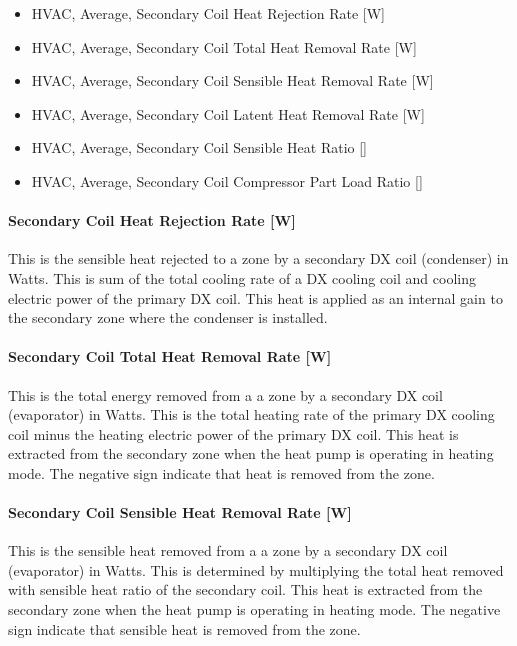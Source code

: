 \begin{itemize}
\item
  HVAC, Average, Secondary Coil Heat Rejection Rate {[}W{]}
\item
  HVAC, Average, Secondary Coil Total Heat Removal Rate {[}W{]}
\item
  HVAC, Average, Secondary Coil Sensible Heat Removal Rate {[}W{]}
\item
  HVAC, Average, Secondary Coil Latent Heat Removal Rate {[}W{]}
\item
  HVAC, Average, Secondary Coil Sensible Heat Ratio {[]}
\item
  HVAC, Average, Secondary Coil Compressor Part Load Ratio {[]}
\end{itemize}

\paragraph{Secondary Coil Heat Rejection Rate {[}W{]}}\label{secondary-coil-heat-rejection-rate-w}

This is the sensible heat rejected to a zone by a secondary DX coil (condenser) in Watts. This is sum of the total cooling rate of a DX cooling coil and cooling electric power of the primary DX coil. This heat is applied as an internal gain to the secondary zone where the condenser is installed.

\paragraph{Secondary Coil Total Heat Removal Rate {[}W{]}}\label{secondary-coil-total-heat-removal-rate-w}

This is the total energy removed from a a zone by a secondary DX coil (evaporator) in Watts. This is the total heating rate of the primary DX cooling coil minus the heating electric power of the primary DX coil. This heat is extracted from the secondary zone when the heat pump is operating in heating mode. The negative sign indicate that heat is removed from the zone.

\paragraph{Secondary Coil Sensible Heat Removal Rate {[}W{]}}\label{secondary-coil-sensible-heat-removal-rate-w}

This is the sensible heat removed from a a zone by a secondary DX coil (evaporator) in Watts. This is determined by multiplying the total heat removed with sensible heat ratio of the secondary coil. This heat is extracted from the secondary zone when the heat pump is operating in heating mode. The negative sign indicate that sensible heat is removed from the zone.

